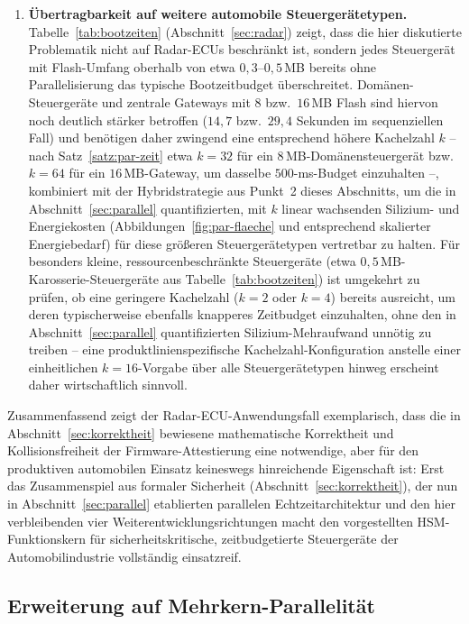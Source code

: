 ﻿\documentclass[a4paper,12pt]{article}
\theoremstyle{definition}
\begin{document}
\begin{enumerate}
	\item \textbf{Übertragbarkeit auf weitere automobile Steuergerätetypen.} Tabelle~\ref{tab:bootzeiten} (Abschnitt~\ref{sec:radar}) zeigt, dass die hier diskutierte Problematik nicht auf Radar-ECUs beschränkt ist, sondern jedes Steuergerät mit Flash-Umfang oberhalb von etwa $0{,}3$--$0{,}5$\,MB bereits ohne Parallelisierung das typische Bootzeitbudget überschreitet. Domänen-Steuergeräte und zentrale Gateways mit $8$ bzw.\ $16$\,MB Flash sind hiervon noch deutlich stärker betroffen ($14{,}7$ bzw.\ $29{,}4$ Sekunden im sequenziellen Fall) und benötigen daher zwingend eine entsprechend höhere Kachelzahl $k$ -- nach Satz~\ref{satz:par-zeit} etwa $k=32$ für ein $8$\,MB-Domänensteuergerät bzw.\ $k=64$ für ein $16$\,MB-Gateway, um dasselbe $500$-ms-Budget einzuhalten --, kombiniert mit der Hybridstrategie aus Punkt~2 dieses Abschnitts, um die in Abschnitt~\ref{sec:parallel} quantifizierten, mit $k$ linear wachsenden Silizium- und Energiekosten (Abbildungen~\ref{fig:par-flaeche} und entsprechend skalierter Energiebedarf) für diese größeren Steuergerätetypen vertretbar zu halten. Für besonders kleine, ressourcenbeschränkte Steuergeräte (etwa $0{,}5$\,MB-Karosserie-Steuergeräte aus Tabelle~\ref{tab:bootzeiten}) ist umgekehrt zu prüfen, ob eine geringere Kachelzahl ($k=2$ oder $k=4$) bereits ausreicht, um deren typischerweise ebenfalls knapperes Zeitbudget einzuhalten, ohne den in Abschnitt~\ref{sec:parallel} quantifizierten Silizium-Mehraufwand unnötig zu treiben -- eine produktlinienspezifische Kachelzahl-Konfiguration anstelle einer einheitlichen $k=16$-Vorgabe über alle Steuergerätetypen hinweg erscheint daher wirtschaftlich sinnvoll.
\end{enumerate}

Zusammenfassend zeigt der Radar-ECU-Anwendungsfall exemplarisch, dass die in Abschnitt~\ref{sec:korrektheit} bewiesene mathematische Korrektheit und Kollisionsfreiheit der Firmware-Attestierung eine notwendige, aber für den produktiven automobilen Einsatz keineswegs hinreichende Eigenschaft ist: Erst das Zusammenspiel aus formaler Sicherheit (Abschnitt~\ref{sec:korrektheit}), der nun in Abschnitt~\ref{sec:parallel} etablierten parallelen Echtzeitarchitektur und den hier verbleibenden vier Weiterentwicklungsrichtungen macht den vorgestellten HSM-Funktionskern für sicherheitskritische, zeitbudgetierte Steuergeräte der Automobilindustrie vollständig einsatzreif.

\subsection{Erweiterung auf Mehrkern-Parallelität}
\end{document}
